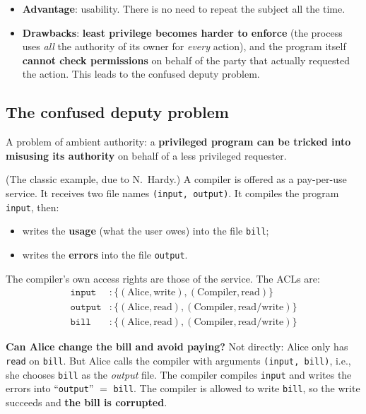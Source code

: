 \begin{itemize}
    \item \textbf{Advantage}: usability. There is no need to repeat the subject all the time.
    \item \textbf{Drawbacks}: \textbf{least privilege becomes harder to enforce} (the process uses \emph{all} the authority of its owner for \emph{every} action), and the program itself \textbf{cannot check permissions} on behalf of the party that actually requested the action. This leads to the confused deputy problem.
\end{itemize}

\subsection{The confused deputy problem}

\begin{definition}
A problem of ambient authority: a \textbf{privileged program can be tricked into misusing its authority} on behalf of a less privileged requester.
\end{definition}

\begin{example}
(The classic example, due to N.\ Hardy.) A compiler is offered as a pay-per-use service. It receives two file names \texttt{(input, output)}. It compiles the program \texttt{input}, then:
\begin{itemize}
    \item writes the \textbf{usage} (what the user owes) into the file \texttt{bill};
    \item writes the \textbf{errors} into the file \texttt{output}.
\end{itemize}

The compiler's own access rights are those of the service. The ACLs are:
\begin{align*}
\texttt{input} &: \{(\text{Alice}, \text{write}), (\text{Compiler}, \text{read})\}\\
\texttt{output} &: \{(\text{Alice}, \text{read}), (\text{Compiler}, \text{read/write})\}\\
\texttt{bill} &: \{(\text{Alice}, \text{read}), (\text{Compiler}, \text{read/write})\}
\end{align*}

\textbf{Can Alice change the bill and avoid paying?} Not directly: Alice only has \texttt{read} on \texttt{bill}. But Alice calls the compiler with arguments \texttt{(input, bill)}, i.e., she chooses \texttt{bill} as the \emph{output} file. The compiler compiles \texttt{input} and writes the errors into ``\texttt{output}'' $=$ \texttt{bill}. The compiler is allowed to write \texttt{bill}, so the write succeeds and \textbf{the bill is corrupted}.
\end{example}

